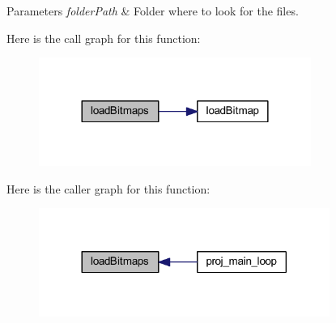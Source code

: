 \begin{DoxyParams}{Parameters}
{\em folder\+Path} & Folder where to look for the files. \\
\hline
\end{DoxyParams}
Here is the call graph for this function\+:\nopagebreak
\begin{figure}[H]
\begin{center}
\leavevmode
\includegraphics[width=252pt]{group__bitmaps_ga5a66eb06403c650e88bc9463e79bf9bc_cgraph}
\end{center}
\end{figure}
Here is the caller graph for this function\+:\nopagebreak
\begin{figure}[H]
\begin{center}
\leavevmode
\includegraphics[width=269pt]{group__bitmaps_ga5a66eb06403c650e88bc9463e79bf9bc_icgraph}
\end{center}
\end{figure}
